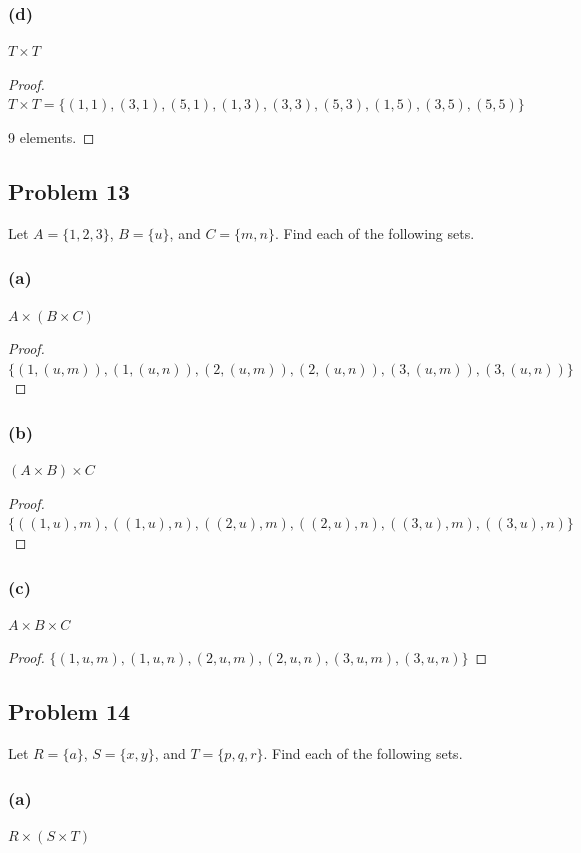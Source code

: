 \documentclass[14pt]{extarticle}
\begin{document}
\subsubsection{(d)}
$T \times T$

\begin{proof}
$T \times T = \{(1, 1), (3, 1), (5, 1), (1, 3), (3, 3), (5, 3), (1, 5), (3, 5),
(5, 5)\}$

9 elements.
\end{proof}

\subsection{Problem 13}
Let $A = \{1, 2, 3\}$, $B = \{u\}$, and $C = \{m, n\}$. Find each of the
following sets.

\subsubsection{(a)}
$A \times (B \times C)$

\begin{proof}
$\{(1, (u, m)), (1, (u, n)), (2, (u, m)), (2, (u, n)),
(3, (u, m)), (3, (u, n))\}$
\end{proof}

\subsubsection{(b)}
$(A \times B) \times C$

\begin{proof}
$\{((1, u), m), ((1, u), n), ((2, u), m),
((2, u), n), ((3, u), m), ((3, u), n)\}$
\end{proof}

\subsubsection{(c)}
$A \times B \times C$

\begin{proof}
$\{(1, u, m), (1, u, n), (2, u, m), (2, u, n), (3, u, m), (3, u, n)\}$
\end{proof}

\subsection{Problem 14}
Let $R = \{a\}$, $S = \{x, y\}$, and $T = \{p, q, r\}$. Find each of the
following sets.

\subsubsection{(a)}
$R \times (S \times T)$
\end{document}
